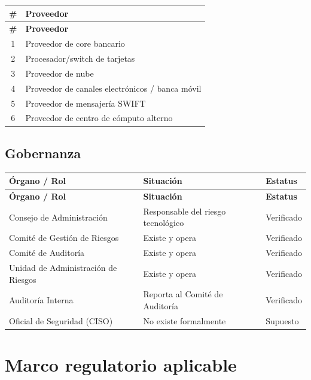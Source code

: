 \documentclass[11pt,a4paper]{article}
\begin{document}
	\begin{longtable}{@{}cp{10cm}@{}}
		\toprule
		\textbf{\#} & \textbf{Proveedor} \\ \midrule
		\endfirsthead
		\toprule
		\textbf{\#} & \textbf{Proveedor} \\ \midrule
		\endhead
		1 & Proveedor de core bancario \\
		2 & Procesador/switch de tarjetas \\
		3 & Proveedor de nube \\
		4 & Proveedor de canales electrónicos / banca móvil \\
		5 & Proveedor de mensajería SWIFT \\
		6 & Proveedor de centro de cómputo alterno \\ \bottomrule
	\end{longtable}
	
	\subsection{Gobernanza}
	
	\begin{longtable}{@{}p{6.5cm}p{6cm}p{2cm}@{}}
		\toprule
		\textbf{Órgano / Rol} & \textbf{Situación} & \textbf{Estatus} \\ \midrule
		\endfirsthead
		\toprule
		\textbf{Órgano / Rol} & \textbf{Situación} & \textbf{Estatus} \\ \midrule
		\endhead
		Consejo de Administración & Responsable del riesgo tecnológico & Verificado \\
		Comité de Gestión de Riesgos & Existe y opera & Verificado \\
		Comité de Auditoría & Existe y opera & Verificado \\
		Unidad de Administración de Riesgos & Existe y opera & Verificado \\
		Auditoría Interna & Reporta al Comité de Auditoría & Verificado \\
		Oficial de Seguridad (CISO) & No existe formalmente & Supuesto \\ \bottomrule
	\end{longtable}
	
	
	\section{Marco regulatorio aplicable}
	
\end{document}
